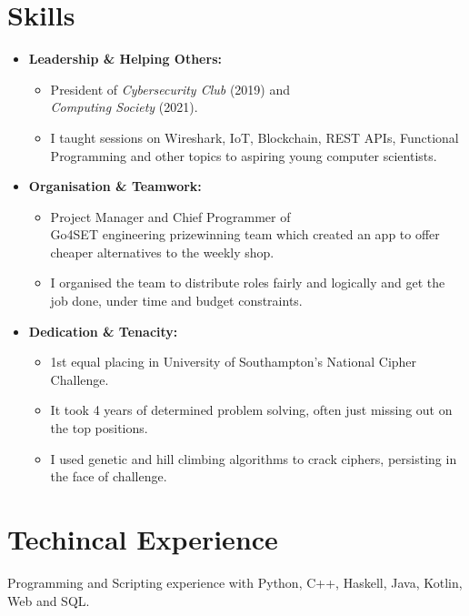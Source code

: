 \documentclass{Resume}
\begin{document}
	\section{Skills}
			\begin{itemize}
				\item \textbf{Leadership \& Helping Others:} 
				    \begin{itemize}
				        \item President of \textit{Cybersecurity Club} (2019) and \\ \textit{Computing Society} (2021).
				        \item I taught sessions on Wireshark, IoT, Blockchain, REST APIs, Functional Programming and other topics to aspiring young computer scientists.
				    \end{itemize} 
				\item \textbf{Organisation \& Teamwork:} 
				    \begin{itemize}
				        \item Project Manager and Chief Programmer of \\ Go4SET engineering prizewinning team which created an app to offer cheaper alternatives to the weekly shop.
				        \item I organised the team to distribute roles fairly and logically and get the job done, under time and budget constraints.
				    \end{itemize}
				\item \textbf{Dedication \& Tenacity:}
				    \begin{itemize}
				        \item 1st equal placing in University of Southampton's National Cipher Challenge.
				        \item It took 4 years of determined problem solving, often just missing out on the top positions.
				        \item I used genetic and hill climbing algorithms to crack ciphers, persisting in the face of challenge.
				    \end{itemize}
			\end{itemize}		

		\newpage
	\section{Techincal Experience}
			Programming and Scripting experience with Python, C++, Haskell, Java, Kotlin, Web and SQL.
\end{document}

